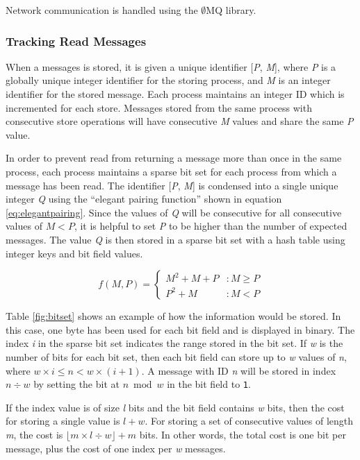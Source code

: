\documentclass[lnicst]{svmultln}
\begin{document}
Network communication is handled using the $\emptyset$MQ library.

\subsubsection{Tracking Read Messages}

    When a messages is stored, it is given a unique identifier [\textit{P}, \textit{M}], where \textit{P} is a globally unique integer identifier for the storing process, and \textit{M} is an integer identifier for the stored message. Each process maintains an integer ID which is incremented for each store. Messages stored from the same process with consecutive store operations will have consecutive \textit{M} values and share the same \textit{P} value.

    In order to prevent read from returning a message more than once in the same process, each process maintains a sparse bit set for each process from which a message has been read. The identifier [\textit{P}, \textit{M}] is condensed into a single unique integer \textit{Q} using the ``elegant pairing function''\cite{szudzikelegant} shown in equation \ref{eq:elegantpairing}. Since the values of \textit{Q} will be consecutive for all consecutive values of $M < P$, it is helpful to set \textit{P} to be higher than the number of expected messages. The value \textit{Q} is then stored in a sparse bit set with a hash table using integer keys and bit field values.

 \begin{equation}
   f(M,P) = \left\{
     \begin{array}{lr}
       M^{2} + M + P & : M \geq P \\
       P^{2} + M & : M < P
     \end{array}
   \right.
   \label{eq:elegantpairing}
\end{equation}

Table \ref{fig:bitset} shows an example of how the information would be stored. In this case, one byte has been used for each bit field and is displayed in binary. The index \textit{i} in the sparse bit set indicates the range stored in the bit set. If \textit{w} is the number of bits for each bit set, then each bit field can store up to \textit{w} values of \textit{n}, where $w \times i \leq n < w \times (i + 1)$. A message with ID \textit{n} will be stored in index $n \div w$ by setting the bit at $n \bmod w$ in the bit field to \texttt{1}.

If the index value is of size \textit{l} bits and the bit field contains \textit{w} bits, then the cost for storing a single value is $l + w$. For storing a set of consecutive values of length \textit{m}, the cost is $\lfloor m \times l \div w\rfloor + m$ bits. In other words, the total cost is one bit per message, plus the cost of one index per \textit{w} messages.
\end{document}
